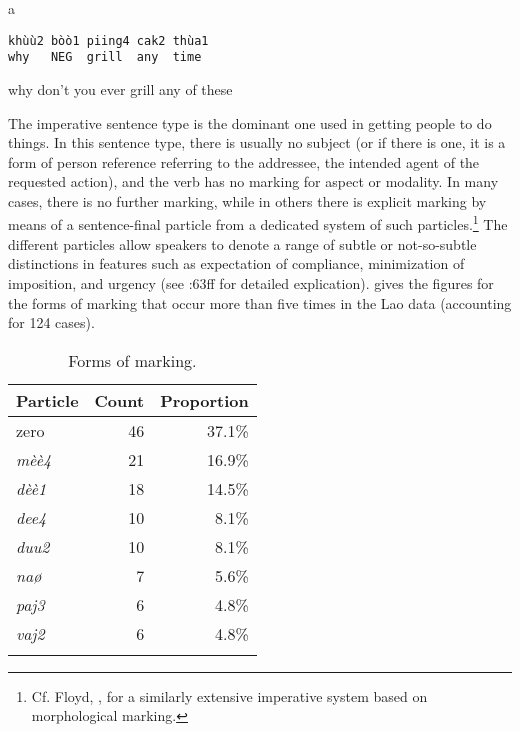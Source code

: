 \documentclass[output=paper]{langsci/langscibook}
\begin{document}
\vspace{-1mm}
%
\begin{mdframednoverticalspace}[style=firstfoc]
\begin{transbox}{1}{a}
\begin{verbatim}
khùù2 bòò1 piing4 cak2 thùa1
why   NEG  grill  any  time
\end{verbatim}
why don't you ever grill any of these
\end{transbox}
\end{mdframednoverticalspace}
%
\begin{mdframednoverticalspace}[style=secondfoc]
\end{mdframednoverticalspace}

The imperative sentence type is the dominant one used in getting people to do things. In this sentence type, there is usually no subject (or if there is one, it is a form of person reference referring to the addressee, the intended agent of the requested action), and the verb has no marking for aspect or modality. In many cases, there is no further marking, while in others there is explicit marking by means of a sentence-final particle from a dedicated system of such particles.\footnote{Cf. Floyd, ,  for a similarly extensive imperative system based on morphological marking.} The different particles allow speakers to denote a range of subtle or not-so-subtle distinctions in features such as expectation of compliance, minimization of imposition, and urgency (see \citealt{Enfield2007}:63ff for detailed explication).  gives the figures for the forms of marking that occur more than five times in the Lao data (accounting for 124 cases).

\begin{table}
\begin{tabularx}{0.5\textwidth}{Xrr}
\lsptoprule
Particle & Count & Proportion\\
\midrule
zero & 46 & 37.1\%\\
\textit{mèè4} & 21 & 16.9\%\\
\textit{dèè1} & 18 & 14.5\%\\
\textit{dee4} & 10 & 8.1\%\\
\textit{duu2} & 10 & 8.1\%\\
\textit{naø} & 7 & 5.6\%\\
\textit{paj3} & 6 & 4.8\%\\
\textit{vaj2} & 6 & 4.8\%\\
\lspbottomrule
\end{tabularx}
\caption{Forms of marking.}
\label{tab:enfield:5}
\end{table}
\end{document}
